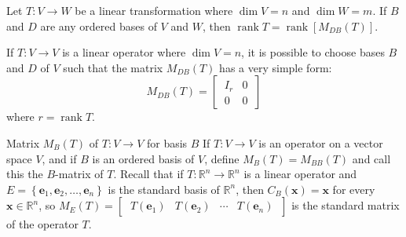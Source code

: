 \documentclass[12pt]{article}
\begin{document}
\begin{theorem}{}{}
    Let $ T : V \to W $ be a linear transformation where $ \dim V = n $ and $ \dim W = m $. If $ B $ and $ D $ are any ordered bases of $ V $ and $ W $, then $ \operatorname{rank} T = \operatorname{rank} \left[ M_{DB} \left( T \right) \right] $.
\end{theorem}

\begin{note}{}{}
    If $ T : V \to V $ is a linear operator where $ \dim V = n $, it is possible to choose bases $ B $ and $ D $ of $ V $ such that the matrix $ M_{DB} \left( T \right) $ has a very simple form:
    \[ M_{DB} \left( T \right) = \begin{bmatrix} \ I_r & 0 \ \\ \ 0 & 0 \ \end{bmatrix} \]
    where $ r = \operatorname{rank} T $.
\end{note}

\begin{definition}{Matrix $ M_{B} \left( T \right) $ of $ T : V \to V $ for basis $ B $}{}
    If $ T : V \to V $ is an operator on a vector space $ V $, and if $ B $ is an ordered basis of $ V $, define $ M_B \left( T \right) = M_{BB} \left( T \right) $ and call this the $ B $-matrix of $ T $.
    \medskip
    \newline
    Recall that if $ T : \mathbb{R}^n \to \mathbb{R}^n $ is a linear operator and $ E = \left\{ \mathbf{e}_1, \mathbf{e}_2, \dots, \mathbf{e}_n \right\} $ is the standard basis of $ \mathbb{R}^n $, then $ C_B \left( \mathbf{x} \right) = \mathbf{x} $ for every $ \mathbf{x} \in \mathbb{R}^n $, so $ M_E \left( T \right) = \begin{bmatrix} \ T \left( \mathbf{e}_1 \right) & T \left( \mathbf{e}_2 \right) & \cdots & T \left( \mathbf{e}_n \right) \ \end{bmatrix} $ is the standard matrix of the operator $ T $.
\end{definition}
\end{document}
